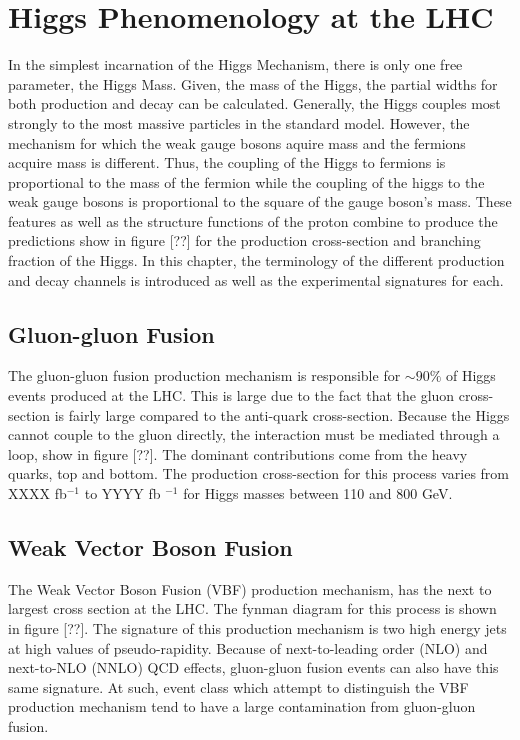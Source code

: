 \chapter{Higgs Phenomenology at the LHC}
\label{sec:HiggsPhen}

In the simplest incarnation of the Higgs Mechanism, there is only one free
parameter, the Higgs Mass.  Given, the mass of the Higgs, the partial widths
for both production and decay can be calculated.  Generally, the Higgs 
couples most strongly to the most massive particles in the standard model.  
However, the mechanism for which the weak gauge bosons aquire mass and the 
fermions acquire mass is different.  Thus, the coupling of the Higgs to 
fermions is proportional to the mass of the fermion while the coupling of the 
higgs to the weak gauge bosons is proportional to the square of the gauge 
boson's mass. These features as well as the structure functions of the proton 
combine to produce the predictions show in figure [??] for the production 
cross-section and branching fraction of the Higgs.  In this chapter, the 
terminology of the different production and decay channels is introduced as 
well as the experimental signatures for each.  

\section{Gluon-gluon Fusion}
\label{sec:ggHiggs}

The gluon-gluon fusion production mechanism is responsible for $\sim 90\%$ of 
Higgs events produced at the LHC.  This is large due to the fact that the gluon
cross-section is fairly large compared to the anti-quark cross-section.  
Because the Higgs cannot couple to the gluon directly, the interaction must
be mediated through a loop, show in figure [??].  The dominant contributions 
come from the heavy quarks, top and bottom.  The production cross-section for
this process varies from XXXX fb$^{-1}$ to YYYY fb $^{-1}$ for Higgs masses 
between 110 and 800 GeV.   

\section{Weak Vector Boson Fusion}
\label{sec:VBFHiggs}

The Weak Vector Boson Fusion (VBF) production mechanism, has the next to
largest cross section at the LHC.  The fynman diagram for this process is 
shown in figure [??].  The signature of this production mechanism is two 
high energy jets at high values of pseudo-rapidity.  Because of next-to-leading
order (NLO) and next-to-NLO (NNLO) QCD effects, gluon-gluon fusion events can
also have this same signature.  At such, event class which attempt to 
distinguish the VBF production mechanism tend to have a large contamination 
from gluon-gluon fusion.  

